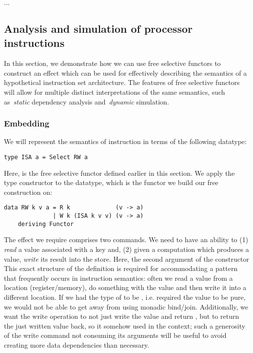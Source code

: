 ...

\subsection{Analysis and simulation of processor instructions}\label{sec-free-isa}

In this section, we demonstrate how we can use free selective functors to construct an
effect which can be used for effectively describing the semantics of a hypothetical
instruction set architecture. The features of free selective functors will allow for
multiple distinct interpretations of the same semantics, such as~\emph{static} dependency
analysis and~\emph{dynamic} simulation.

\subsubsection{Embedding}

We will represent the semantics of instruction in terms of the following datatype:

\begin{verbatim}
type ISA a = Select RW a
\end{verbatim}

Here,  is the free selective functor defined earlier in this section.
We apply the  type constructor to the  datatype, which is the
functor we build our free construction on:

\begin{verbatim}
data RW k v a = R k             (v -> a)
              | W k (ISA k v v) (v -> a)
    deriving Functor
\end{verbatim}

The effect we require comprises two commands. We need to have an ability to (1)
\emph{read} a value associated with a key and, (2) given a computation which produces a value,
\emph{write} its result into the store. Here, the second argument of the  constructor
This exact structure of the definition is required for accommodating a pattern that
frequently occurs in instruction semantics: often we read a value from a location
(register/memory), do something with the value and then write it into a different location.
If we had the type of  to be , i.e. required the value to be pure,
we would not be able to get away from using monadic bind/join. Additionally, we want the write
operation to not just write the value and return \hs{()}, but to return the just written value
back, so it somehow used in the context; such a generosity of the write command not consuming
its arguments will be useful to avoid creating more data dependencies than necessary.

